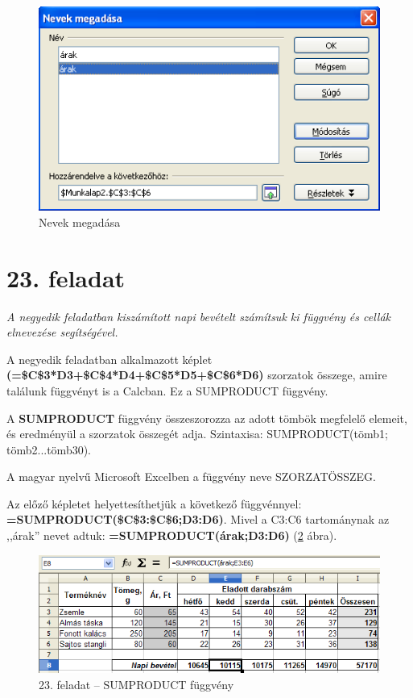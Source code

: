 \begin{figure}[!h]
\begin{center}
\includegraphics[width=11.562cm]{oocalcv1-img105.png}
\caption{Nevek megadása}\label{NevekMegadása}
\end{center}
\end{figure}


\section{23. feladat }

{\itshape
A negyedik feladatban kiszámított napi bevételt számítsuk ki
függvény és cellák elnevezése segítségével.}

A negyedik feladatban alkalmazott képlet
{\sffamily\bfseries{(=\$C\$3*D3+\$C\$4*D4+\$C\$5*D5+\$C\$6*D6)}}
szorzatok összege, amire találunk függvényt is a Calcban. Ez a
SUMPRODUCT függvény.

A \textbf{SUMPRODUCT} függvény
összeszorozza az adott tömbök megfelelő elemeit, és
eredményül a szorzatok összegét adja. Szintaxisa:
SUMPRODUCT(tömb1; tömb2...tömb30).

A magyar nyelvű Microsoft Excelben a függvény neve
SZORZATÖSSZEG.

Az előző képletet helyettesíthetjük a következő függvénnyel:\\
{\sffamily\bfseries{=SUMPRODUCT(\$C\$3:\$C\$6;D3:D6)}}.
Mivel a C3:C6 tartománynak az ,,árak'' nevet adtuk:
{\sffamily\bfseries{=SUMPRODUCT(árak;D3:D6)}} (\ref{23-feladatSUMPRODUCT} ábra).

\begin{figure}[!h]
\begin{center}
\includegraphics[width=15.212cm]{oocalcv1-img106.png}
\caption{23. feladat --  SUMPRODUCT függvény}\label{23-feladatSUMPRODUCT}
\end{center}
\end{figure}


